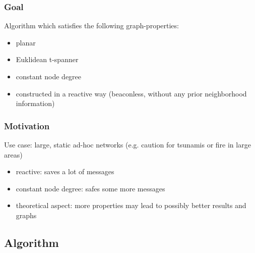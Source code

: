 \documentclass[compress]{beamer}
\begin{document}
\begin{frame}
\frametitle{Goal}
Algorithm which satisfies the following graph-properties:
\begin{itemize}
\item planar
\item Euklidean t-spanner
\item constant node degree
\item constructed in a reactive way (beaconless, without any prior neighborhood information)
\end{itemize}
\end{frame}

\begin{frame}
\frametitle{Motivation}
Use case: large, static ad-hoc networks (e.g. caution for tsunamis or fire in large areas)
\begin{itemize}
\item reactive: saves a lot of messages
\item constant node degree: safes some more messages
\item theoretical aspect: more properties may lead to possibly better results and graphs
\end{itemize}
\end{frame}

\subsection{Algorithm}
\end{document}
